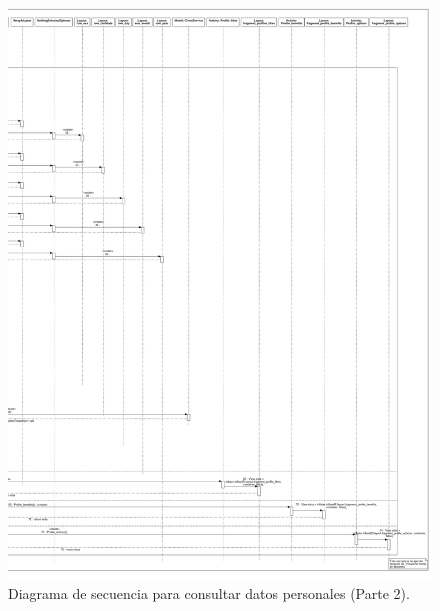 \FloatBarrier
\begin{figure}[htbp!]
		\centering
			\includegraphics[width=.95 \textwidth]{imagenes/Diagramas_UserApp/Nuevos_diagramas/VerPerfil_2}
		\caption{Diagrama de secuencia para consultar datos personales (Parte 2).}
		\label{image:consulta3}
\end{figure}
\FloatBarrier


